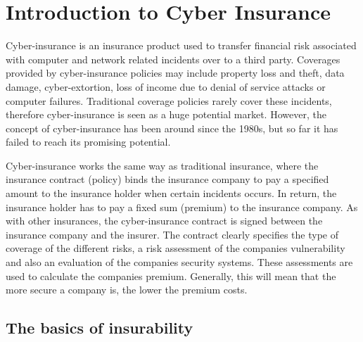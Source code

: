 \chapter{Introduction to Cyber Insurance}
\label{chp:introductionToCyberInsurance} 

Cyber-insurance is an insurance product used to transfer financial risk
associated with computer and network related incidents over to a third party.
 Coverages provided by cyber-insurance policies may include property loss and
theft, data damage, cyber-extortion, loss of income due to denial of service attacks or computer failures. \cite{washingtonpaper}
Traditional coverage policies rarely cover these incidents, therefore cyber-insurance is seen as a huge potential market. However, the concept of cyber-insurance has been around since the 1980s, but so far it has failed to reach its promising potential. 
  
 
Cyber-insurance works the same way as traditional insurance, where the insurance contract (policy) binds the insurance company to pay a specified amount to the insurance holder when certain incidents occurs. In return, the insurance holder has to pay a fixed sum (premium) to the insurance company. \cite{robinson2012incentives}
    As with other insurances, the cyber-insurance contract is signed between the insurance company and the insurer. The contract clearly specifies the type of coverage of the different risks, a risk assessment of the companies vulnerability and also an evaluation of the companies security systems. These assessments are used to calculate the companies premium. \cite{robinson2012incentives} Generally, this will mean that the more secure a company is, the lower the premium costs.  

\section{The basics of insurability}

